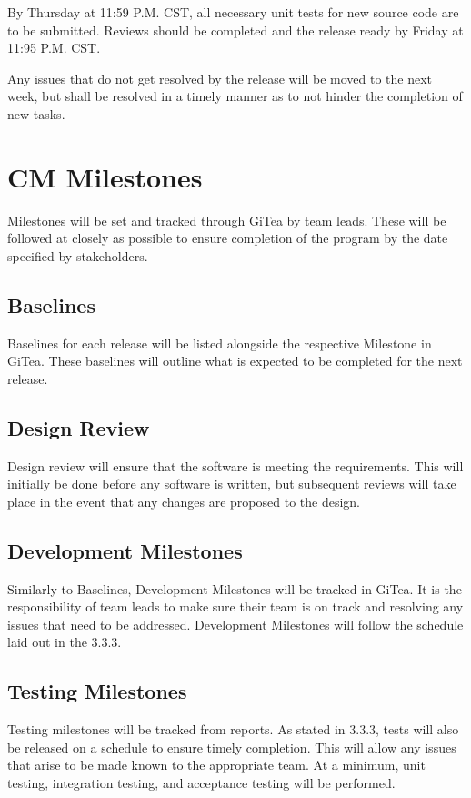 \documentclass[letterpaper,12pt,oneside,listof=totoc]{scrreprt}
\begin{document}
By Thursday at 11:59 P.M. CST, all necessary unit tests for new source code are to be submitted. Reviews should be completed and the release ready by Friday at 11:95 P.M. CST.

Any issues that do not get resolved by the release will be moved to the next week, but shall be resolved in a timely manner as to not hinder the completion of new tasks. 

\section{CM Milestones}

Milestones will be set and tracked through GiTea by team leads. These will be followed at closely as possible to ensure completion of the program by the date specified by stakeholders.

\subsection{Baselines}
Baselines for each release will be listed alongside the respective Milestone in GiTea. These baselines will outline what is expected to be completed for the next release.

\subsection{Design Review}
Design review will ensure that the software is meeting the requirements. This will initially be done before any software is written, but subsequent reviews will take place in the event that any changes are proposed to the design.

\subsection{Development Milestones}
Similarly to Baselines, Development Milestones will be tracked in GiTea. It is the responsibility of team leads to make sure their team is on track and resolving any issues that need to be addressed. Development Milestones will follow the schedule laid out in the 3.3.3.

\subsection{Testing Milestones}
Testing milestones will be tracked from reports. As stated in 3.3.3, tests will also be released on a schedule to ensure timely completion. This will allow any issues that arise to be made known to the appropriate team. At a minimum, unit testing, integration testing, and acceptance testing will be performed. 
\end{document}
